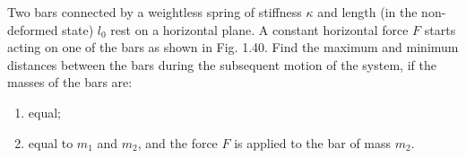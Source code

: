 \item Two bars connected by a weightless spring of stiffness \( \kappa \) and length (in the non-deformed state) \( l_0 \) rest on a horizontal plane. A constant horizontal force \( F \) starts acting on one of the bars as shown in Fig. 1.40. Find the maximum and minimum distances between the bars during the subsequent motion of the system, if the masses of the bars are:
   \begin{enumerate}
       \item equal;
       \item equal to \( m_1 \) and \( m_2 \), and the force \( F \) is applied to the bar of mass \( m_2 \).
   \end{enumerate}\begin{solution}
    \begin{center}
    \end{center}
    

\end{solution}
